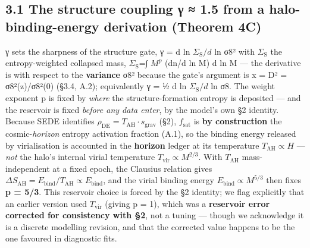 \documentclass[
  10pt,
]{article}
\begin{document}
\subsection{3.1 The structure coupling γ ≈ 1.5 from a
halo-binding-energy derivation (Theorem
4C)}\label{the-structure-coupling-ux3b3-1.5-from-a-halo-binding-energy-derivation-theorem-4c}

γ sets the sharpness of the structure gate, γ = d ln
\(\Sigma _{\mathrm{S}} / d\) ln σ8² with \(\Sigma _{\mathrm{S}}\) the
entropy-weighted collapsed mass, \(\Sigma _{\mathrm{S}}\)=∫ \(M^{p}\)
(dn/d ln M) d ln M --- the derivative is with respect to the
\textbf{variance} σ8² because the gate's argument is x = D² =
σ8²(z)/σ8²(0) (§3.4, A.2); equivalently γ = ½ d ln
\(\Sigma _{\mathrm{S}}/d\) ln σ8. The weight exponent p is fixed by
\emph{where} the structure-formation entropy is deposited --- and the
reservoir is fixed \emph{before any data enter}, by the model's own §2
identity. Because SEDE identifies
\(\rho _{\mathrm{DE}} = T_{\mathrm{AH}}\cdot s_{\mathrm{grav}}\) (§2),
\(f_{\mathrm{sat}}\) is \textbf{by construction} the
cosmic-\emph{horizon} entropy activation fraction (A.1), so the binding
energy released by virialisation is accounted in the \textbf{horizon}
ledger at its temperature \(T_{\mathrm{AH}} \propto  H\) --- \emph{not}
the halo's internal virial temperature
\(T_{\mathrm{vir}} \propto  M^{2/3}\). With \(T_{\mathrm{AH}}\)
mass-independent at a fixed epoch, the Clausius relation gives
\(\Delta S_{\mathrm{AH}} = E_{\mathrm{bind}}/T_{\mathrm{AH}} \propto  E_{\mathrm{bind}}\),
and the virial binding energy \(E_{\mathrm{bind}} \propto  M^{5/3}\)
then fixes \textbf{p = 5/3}. This reservoir choice is forced by the §2
identity; we flag explicitly that an earlier version used
\(T_{\mathrm{vir}}\) (giving p = 1), which was a \textbf{reservoir error
corrected for consistency with §2}, not a tuning --- though we
acknowledge it is a discrete modelling revision, and that the corrected
value happens to be the one favoured in diagnostic fits.
\end{document}
